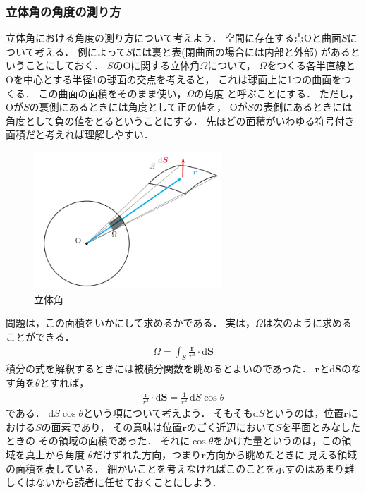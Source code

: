 \subsubsection{立体角の角度の測り方}
立体角における角度の測り方について考えよう．
空間に存在する点Oと曲面$S$について考える．
例によって$S$には裏と表(閉曲面の場合には内部と外部)
があるということにしておく．
$S$のOに関する立体角$\Omega$について，
$\Omega$をつくる各半直線とOを中心とする半径1の球面の交点を考えると，
これは球面上に1つの曲面をつくる．
この曲面の面積をそのまま使い，$\Omega$の角度
と呼ぶことにする．
ただし，Oが$S$の裏側にあるときには角度として正の値を，
Oが$S$の表側にあるときには角度として負の値をとるということにする．
先ほどの面積がいわゆる符号付き面積だと考えれば理解しやすい．

\begin{figure}[h]
 \centering
 \includegraphics[width=7cm]{picture/steradian}
 \caption{立体角}
\label{fig:steradian}
\end{figure}

問題は，この面積をいかにして求めるかである．
実は，$\Omega$は次のように求めることができる．
\begin{align}
\Omega = \int_S \frac{\bm{r} }{r^3} \cdot \mathrm{d} \bm{S}
\label{eq:ritaikaku}
\end{align}
積分の式を解釈するときには被積分関数を眺めるとよいのであった．
$\bm{r}$と$\mathrm{d}\bm{S}$のなす角を$\theta$とすれば，
\begin{align*}
\frac{\bm{r}}{r^3} \cdot \mathrm{d} \bm{S} = \frac{1}{r^2} \, \mathrm{d} S \cos \theta
\end{align*}
である．
$\mathrm{d}S \cos\theta$という項について考えよう．
そもそも$\mathrm{d}S$というのは，位置$\bm{r}$における$S$の面素であり，
その意味は位置$\bm{r}$のごく近辺において$S$を平面とみなしたときの
その領域の面積であった．
それに$\cos \theta$をかけた量というのは，この領域を真上から角度
$\theta$だけずれた方向，つまり$\bm{r}$方向から眺めたときに
見える領域の面積を表している．
細かいことを考えなければこのことを示すのはあまり難しくはないから読者に任せておくことにしよう．

